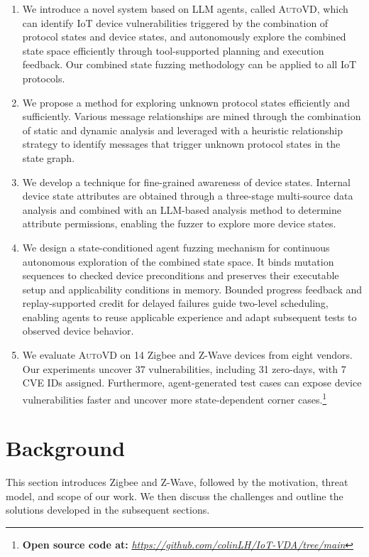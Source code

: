 \documentclass[10pt,journal,compsoc]{IEEEtran}
\newcommand{\system}{\textsc{AutoVD}}
\begin{document}
\begin{enumerate}[$\bullet$]
    \setlength{\itemsep}{3pt}
    \item We introduce a novel system based on LLM agents, called \system{}, which can identify IoT device vulnerabilities triggered by the combination of protocol states and device states, and autonomously explore the combined state space efficiently through tool-supported planning and execution feedback. Our combined state fuzzing methodology can be applied to all IoT protocols.

    \item We propose a method for exploring unknown protocol states efficiently and sufficiently. Various message relationships are mined through the combination of static and dynamic analysis and leveraged with a heuristic relationship strategy to identify messages that trigger unknown protocol states in the state graph.
    
    \item We develop a technique for fine-grained awareness of device states. Internal device state attributes are obtained through a three-stage multi-source data analysis and combined with an LLM-based analysis method to determine attribute permissions, enabling the fuzzer to explore more device states.

    \item We design a state-conditioned agent fuzzing mechanism for continuous autonomous exploration of the combined state space. It binds mutation sequences to checked device preconditions and preserves their executable setup and applicability conditions in memory. Bounded progress feedback and replay-supported credit for delayed failures guide two-level scheduling, enabling agents to reuse applicable experience and adapt subsequent tests to observed device behavior.
    
    \item We evaluate \system{} on 14 Zigbee and Z-Wave devices from eight vendors. Our experiments uncover 37 vulnerabilities, including 31 zero-days, with 7 CVE IDs assigned. Furthermore, agent-generated test cases can expose device vulnerabilities faster and uncover more state-dependent corner cases.\footnote[1]{\textbf{Open source code at:} \textit{\url{https://github.com/colinLH/IoT-VDA/tree/main}}}
    
\end{enumerate}


\section{Background} \label{Background}
This section introduces Zigbee and Z-Wave, followed by the motivation, threat model, and scope of our work. We then discuss the challenges and outline the solutions developed in the subsequent sections.
\end{document}
